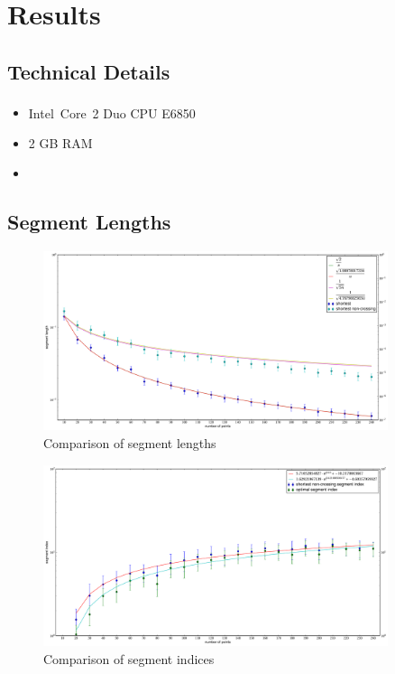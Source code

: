 \chapter{Results}

\section{Technical Details}
\begin{itemize}
  \item Intel\textsuperscript{\textregistered}~Core\texttrademark~2 Duo CPU E6850
  \item 2 GB RAM
  \item {}
\end{itemize}

\section{Segment Lengths}

\begin{figure}[ht]
  \centering
  \includegraphics[width=0.9\textwidth]{results/shortest_length.pdf}
  \caption{Comparison of segment lengths\label{fig:segment_lengths}}
\end{figure}

\begin{figure}[ht]
  \centering
  \includegraphics[width=0.9\textwidth]{results/shortest_index.pdf}
  \caption{Comparison of segment indices\label{fig:segment_index}}
\end{figure}

